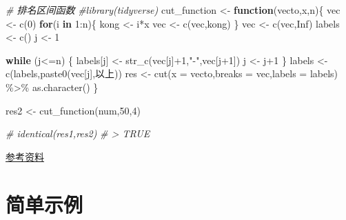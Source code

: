 \documentclass[
]{book}
\newenvironment{Shaded}{\begin{snugshade}}{\end{snugshade}}
\newcommand{\AttributeTok}[1]{\textcolor[rgb]{0.77,0.63,0.00}{#1}}
\newcommand{\CommentTok}[1]{\textcolor[rgb]{0.56,0.35,0.01}{\textit{#1}}}
\newcommand{\ConstantTok}[1]{\textcolor[rgb]{0.00,0.00,0.00}{#1}}
\newcommand{\ControlFlowTok}[1]{\textcolor[rgb]{0.13,0.29,0.53}{\textbf{#1}}}
\newcommand{\DecValTok}[1]{\textcolor[rgb]{0.00,0.00,0.81}{#1}}
\newcommand{\FunctionTok}[1]{\textcolor[rgb]{0.00,0.00,0.00}{#1}}
\newcommand{\NormalTok}[1]{#1}
\newcommand{\OtherTok}[1]{\textcolor[rgb]{0.56,0.35,0.01}{#1}}
\newcommand{\SpecialCharTok}[1]{\textcolor[rgb]{0.00,0.00,0.00}{#1}}
\newcommand{\StringTok}[1]{\textcolor[rgb]{0.31,0.60,0.02}{#1}}
\begin{document}
\begin{Shaded}
\begin{Highlighting}[]
\CommentTok{\# 排名区间函数}
\CommentTok{\#library(tidyverse)}
\NormalTok{cut\_function }\OtherTok{\textless{}{-}} \ControlFlowTok{function}\NormalTok{(vecto,x,n)\{}
\NormalTok{  vec }\OtherTok{\textless{}{-}} \FunctionTok{c}\NormalTok{(}\DecValTok{0}\NormalTok{)}
  \ControlFlowTok{for}\NormalTok{(i }\ControlFlowTok{in} \DecValTok{1}\SpecialCharTok{:}\NormalTok{n)\{}
\NormalTok{    kong }\OtherTok{\textless{}{-}}\NormalTok{  i}\SpecialCharTok{*}\NormalTok{x}
\NormalTok{    vec }\OtherTok{\textless{}{-}} \FunctionTok{c}\NormalTok{(vec,kong)}
\NormalTok{  \}}
\NormalTok{  vec }\OtherTok{\textless{}{-}} \FunctionTok{c}\NormalTok{(vec,}\ConstantTok{Inf}\NormalTok{)}
\NormalTok{  labels }\OtherTok{\textless{}{-}} \FunctionTok{c}\NormalTok{()}
\NormalTok{  j }\OtherTok{\textless{}{-}} \DecValTok{1}
  
  \ControlFlowTok{while}\NormalTok{ (j}\SpecialCharTok{\textless{}=}\NormalTok{n) \{}
\NormalTok{    labels[j] }\OtherTok{\textless{}{-}} \FunctionTok{str\_c}\NormalTok{(vec[j]}\SpecialCharTok{+}\DecValTok{1}\NormalTok{,}\StringTok{"{-}"}\NormalTok{,vec[j}\SpecialCharTok{+}\DecValTok{1}\NormalTok{])}
\NormalTok{    j }\OtherTok{\textless{}{-}}\NormalTok{ j}\SpecialCharTok{+}\DecValTok{1}
\NormalTok{  \}}
\NormalTok{  labels }\OtherTok{\textless{}{-}} \FunctionTok{c}\NormalTok{(labels,}\FunctionTok{paste0}\NormalTok{(vec[j],}\StringTok{\textquotesingle{}以上\textquotesingle{}}\NormalTok{))}
\NormalTok{  res }\OtherTok{\textless{}{-}} \FunctionTok{cut}\NormalTok{(}\AttributeTok{x =}\NormalTok{ vecto,}\AttributeTok{breaks =}\NormalTok{ vec,}\AttributeTok{labels =}\NormalTok{ labels) }\SpecialCharTok{\%\textgreater{}\%} \FunctionTok{as.character}\NormalTok{()}
\NormalTok{\}}

\NormalTok{res2 }\OtherTok{\textless{}{-}} \FunctionTok{cut\_function}\NormalTok{(num,}\DecValTok{50}\NormalTok{,}\DecValTok{4}\NormalTok{)}

\CommentTok{\# identical(res1,res2)}
\CommentTok{\# \textgreater{} TRUE}
\end{Highlighting}
\end{Shaded}

\href{https://r4ds.had.co.nz/functions.html}{参考资料}

\hypertarget{ux7b80ux5355ux793aux4f8b-1}{%
\section{简单示例}\label{ux7b80ux5355ux793aux4f8b-1}}
\end{document}
